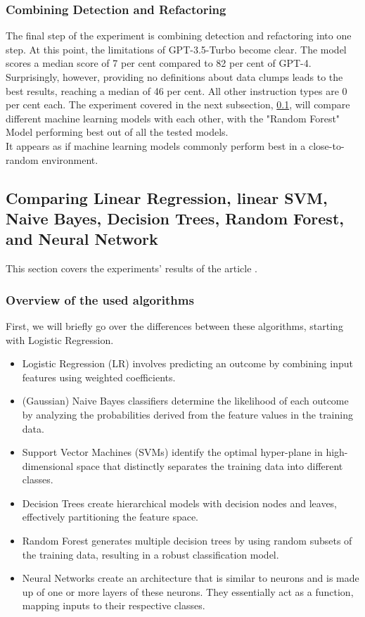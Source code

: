 \subsubsection{Combining Detection and Refactoring}
The final step of the experiment is combining detection and refactoring into one step. At this point, the limitations of GPT-3.5-Turbo become clear. The model scores a median score of 7 per cent compared to 82 per cent of GPT-4.
Surprisingly, however, providing no definitions about data clumps leads to the best results, reaching a median of 46 per cent.
All other instruction types are 0 per cent each.
The experiment covered in the next subsection, \ref{comparingAlgorithms}, will compare different machine learning models with each other, with the "Random Forest" Model performing best out of all the tested models.\\
It appears as if machine learning models commonly perform best in a close-to-random environment.
\subsection{Comparing Linear Regression, linear SVM, Naive Bayes, Decision Trees, Random Forest, and Neural Network} \label{comparingAlgorithms}
This section covers the experiments' results of the article \cite[The effectiveness of supervised machine learning algorithms in predicting software refactoring]{aniche2020effectiveness}.
\subsubsection{Overview of the used algorithms}
First, we will briefly go over the differences between these algorithms, starting with Logistic Regression.
\begin{itemize}
    \item Logistic Regression (LR) \cite{biship2007pattern} involves predicting an outcome by combining input features using weighted coefficients.
    \item (Gaussian) Naive Bayes classifiers \cite{zhang2014optimality} determine the likelihood of each outcome by analyzing the probabilities derived from the feature values in the training data.
    \item Support Vector Machines (SVMs) \cite{cortes1995support} identify the optimal hyper-plane in high-dimensional space that distinctly separates the training data into different classes.
    \item Decision Trees \cite{quinlan2014c4} create hierarchical models with decision nodes and leaves, effectively partitioning the feature space.
    \item Random Forest \cite{breiman2001random} generates multiple decision trees by using random subsets of the training data, resulting in a robust classification model.
    \item Neural Networks \cite{goodfellow2016deep} create an architecture that is similar to neurons and is made up of one or more layers of these neurons. They essentially act as a function, mapping inputs to their respective classes.
\end{itemize}

